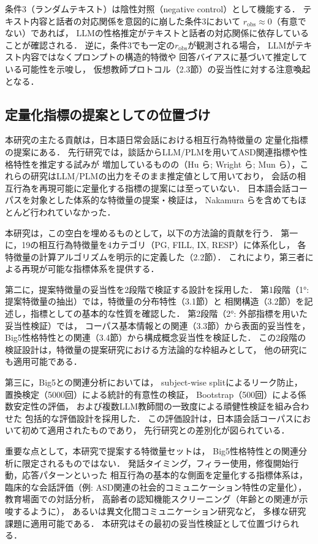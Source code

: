 \documentclass[dvipdfmx,11pt,a4paper]{bxjsarticle}
\renewcommand{\_}{\paperorigunderscore\allowbreak}%
\begin{document}
条件3（ランダムテキスト）は陰性対照（negative control）として機能する．
テキスト内容と話者の対応関係を意図的に崩した条件3において
$r_{\text{obs}} \approx 0$（有意でない）であれば，
LLMの性格推定がテキストと話者の対応関係に依存していることが確認される．
逆に，条件3でも一定の$r_{\text{obs}}$が観測される場合，
LLMがテキスト内容ではなくプロンプトの構造的特徴や
回答バイアスに基づいて推定している可能性を示唆し，
仮想教師プロトコル（2.3節）の妥当性に対する注意喚起となる．

\subsection{定量化指標の提案としての位置づけ}

本研究の主たる貢献は，日本語日常会話における相互行為特徴量の
定量化指標の提案にある．
先行研究では，談話からLLM/PLMを用いてASD関連指標や性格特性を推定する試みが
増加しているものの（Hu ら\cite{hu2025}; Wright ら\cite{wright2026};
Mun ら\cite{mun2024}），これらの研究はLLM/PLMの出力をそのまま推定値として用いており，
会話の相互行為を再現可能に定量化する指標の提案には至っていない．
日本語会話コーパスを対象とした体系的な特徴量の提案・検証は，
Nakamura ら\cite{nakamura2025}を含めてもほとんど行われていなかった．

本研究は，この空白を埋めるものとして，以下の方法論的貢献を行う．
第一に，19の相互行為特徴量を4カテゴリ（PG, FILL, IX, RESP）に体系化し，
各特徴量の計算アルゴリズムを明示的に定義した（2.2節）．
これにより，第三者による再現が可能な指標体系を提供する．

第二に，提案特徴量の妥当性を2段階で検証する設計を採用した．
第1段階（1°: 提案特徴量の抽出）では，特徴量の分布特性（3.1節）と
相関構造（3.2節）を記述し，指標としての基本的な性質を確認した．
第2段階（2°: 外部指標を用いた妥当性検証）では，
コーパス基本情報との関連（3.3節）から表面的妥当性を，
Big5性格特性との関連（3.4節）から構成概念妥当性を検証した．
この2段階の検証設計は，特徴量の提案研究における方法論的な枠組みとして，
他の研究にも適用可能である．

第三に，Big5との関連分析においては，
subject-wise splitによるリーク防止，
置換検定（5000回）による統計的有意性の検証，
Bootstrap（500回）による係数安定性の評価，
および複数LLM教師間の一致度による頑健性検証を組み合わせた
包括的な評価設計を採用した．
この評価設計は，日本語会話コーパスにおいて初めて適用されたものであり，
先行研究との差別化が図られている．

重要な点として，本研究で提案する特徴量セットは，
Big5性格特性との関連分析に限定されるものではない．
発話タイミング，フィラー使用，修復開始行動，応答パターンといった
相互行為の基本的な側面を定量化する指標体系は，
臨床的な会話評価（例: ASD関連の社会的コミュニケーション特性の定量化），
教育場面での対話分析，
高齢者の認知機能スクリーニング（年齢との関連が示唆するように），
あるいは異文化間コミュニケーション研究など，
多様な研究課題に適用可能である．
本研究はその最初の妥当性検証として位置づけられる．
\end{document}
